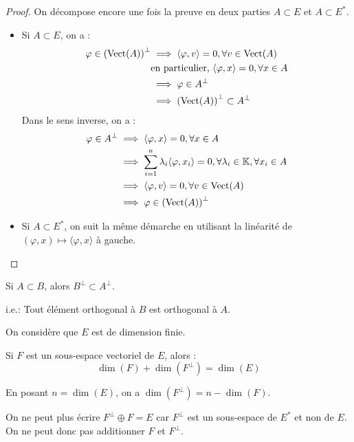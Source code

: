 \documentclass[11pt,a4paper]{report}
\begin{document}
\begin{proof}
    On décompose encore une fois la preuve en deux parties $A \subset E$ et $A \subset E^*$.
    \begin{itemize}
        \item Si $A \subset E$, on a :
        \begin{align*}
        \varphi \in \left(\mathrm{Vect}(A)\right)^\perp &\implies \langle \varphi , v \rangle = 0, \forall v \in \mathrm{Vect}(A) \\
        &\text{en particulier, } \langle \varphi, x \rangle = 0, \forall x \in A \\
        &\implies \varphi \in A^\perp \\
        &\implies \left(\mathrm{Vect}(A)\right)^\perp \subset A^\perp
        \end{align*}
        Dans le sens inverse, on a :
        \begin{align*}
        \varphi \in A^\perp &\implies \langle \varphi, x \rangle = 0, \forall x \in A \\
        &\implies \sum_{i=1}^n \lambda_i \langle \varphi, x_i \rangle = 0, \forall \lambda_i \in \mathbb{K}, \forall x_i \in A \\
        &\implies \langle \varphi, v \rangle = 0, \forall v \in \mathrm{Vect}(A) \\
        &\implies \varphi \in \left(\mathrm{Vect}(A)\right)^\perp \end{align*}
        \item Si $A \subset E^*$, on suit la même démarche en utilisant la linéarité de $(\varphi,x) \mapsto \langle \varphi, x \rangle$ à gauche.
    \end{itemize}
\end{proof}

\begin{property}
    Si $A \subset B$, alors $B^\perp \subset A^\perp$.

    i.e.: Tout élément orthogonal à $B$ est orthogonal à $A$.
\end{property}

\begin{proposition}
    On considère que $E$ est de dimension finie.

    Si $F$ est un sous-espace vectoriel de $E$, alors :
    $$\dim(F) + \dim(F^\perp) = \dim(E)$$

    En posant $n = \dim(E)$, on a $\dim(F^\perp) = n - \dim(F)$.
\end{proposition}

\begin{attention}
    On ne peut plus écrire $F^\perp \oplus F = E$ car $F^\perp$ est un sous-espace de $E^*$ et non de $E$. On ne peut donc pas additionner $F$ et $F^\perp$.
\end{attention}
\end{document}
